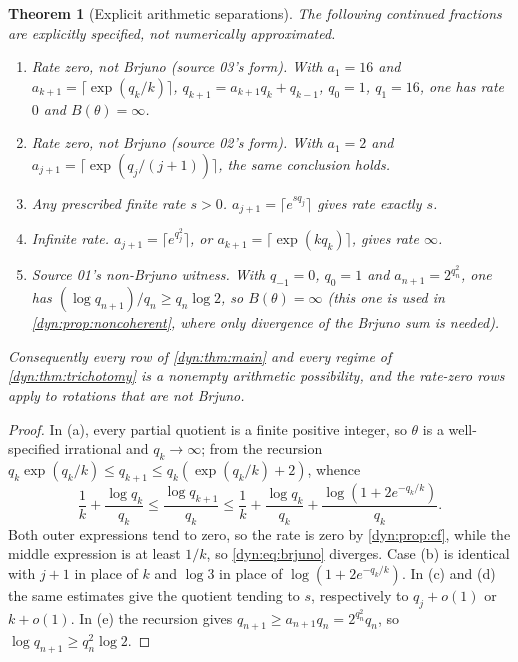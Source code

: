 \documentclass[11pt,letterpaper]{article}
\newtheorem{theorem}{Theorem}[section]
\theoremstyle{definition}
\theoremstyle{remark}
\numberwithin{equation}{section}
\begin{document}
\begin{theorem}[Explicit arithmetic separations]\label{dyn:thm:nonbrjuno}
The following continued fractions are explicitly specified, not
numerically approximated.
\begin{enumerate}[label=(\alph*)]
\item \emph{Rate zero, not Brjuno (source 03's form).} With $a_1=16$ and
$a_{k+1}=\lceil\exp(q_k/k)\rceil$, $q_{k+1}=a_{k+1}q_k+q_{k-1}$,
$q_0=1$, $q_1=16$, one has rate $0$ and $B(\theta)=\infty$.
\item \emph{Rate zero, not Brjuno (source 02's form).} With $a_1=2$ and
$a_{j+1}=\lceil\exp(q_j/(j+1))\rceil$, the same conclusion holds.
\item \emph{Any prescribed finite rate $s>0$.}
$a_{j+1}=\lceil e^{sq_j}\rceil$ gives rate exactly $s$.
\item \emph{Infinite rate.} $a_{j+1}=\lceil e^{q_j^{2}}\rceil$, or
$a_{k+1}=\lceil\exp(kq_k)\rceil$, gives rate $\infty$.
\item \emph{Source 01's non-Brjuno witness.} With $q_{-1}=0$, $q_0=1$ and
$a_{n+1}=2^{q_n^{2}}$, one has $(\log q_{n+1})/q_n\ge q_n\log2$, so
$B(\theta)=\infty$ (this one is used in \cref{dyn:prop:noncoherent}, where
only divergence of the Brjuno sum is needed).
\end{enumerate}
Consequently every row of \cref{dyn:thm:main} and every regime of
\cref{dyn:thm:trichotomy} is a nonempty arithmetic possibility, and the
rate-zero rows apply to rotations that are not Brjuno.
\end{theorem}
\begin{proof}
In (a), every partial quotient is a finite positive integer, so $\theta$ is
a well-specified irrational and $q_k\to\infty$; from the recursion
$q_k\exp(q_k/k)\le q_{k+1}\le q_k(\exp(q_k/k)+2)$, whence
\[
 \frac1k+\frac{\log q_k}{q_k}\le\frac{\log q_{k+1}}{q_k}
 \le\frac1k+\frac{\log q_k}{q_k}+\frac{\log(1+2e^{-q_k/k})}{q_k}.
\]
Both outer expressions tend to zero, so the rate is zero by
\cref{dyn:prop:cf}, while the middle expression is at least $1/k$, so
\eqref{dyn:eq:brjuno} diverges. Case (b) is identical with $j+1$ in place
of $k$ and $\log3$ in place of $\log(1+2e^{-q_k/k})$. In (c) and (d) the
same estimates give the quotient tending to $s$, respectively to
$q_j+o(1)$ or $k+o(1)$. In (e) the recursion gives
$q_{n+1}\ge a_{n+1}q_n=2^{q_n^{2}}q_n$, so
$\log q_{n+1}\ge q_n^{2}\log2$.
\end{proof}
\end{document}

